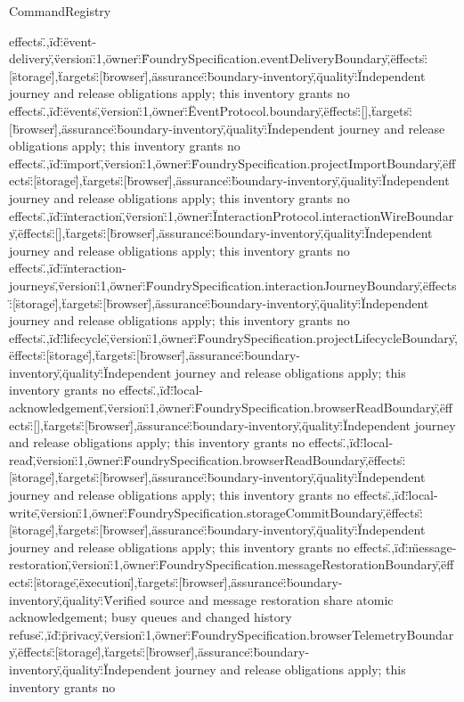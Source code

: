 \begin{lexlean}{CommandRegistry}
\begin{semanticmodule}
{effects.\"},{\"id\":\"event-delivery\",\"version\":1,\"owner\":\"FoundrySpecification.eventDeliveryBoundary\",\"effects\":[\"storage\"],\"targets\":[\"browser\"],\"assurance\":\"boundary-inventory\",\"quality\":\"Independent journey and release obligations apply; this inventory grants no effects.\"},{\"id\":\"events\",\"version\":1,\"owner\":\"EventProtocol.boundary\",\"effects\":[],\"targets\":[\"browser\"],\"assurance\":\"boundary-inventory\",\"quality\":\"Independent journey and release obligations apply; this inventory grants no effects.\"},{\"id\":\"import\",\"version\":1,\"owner\":\"FoundrySpecification.projectImportBoundary\",\"effects\":[\"storage\"],\"targets\":[\"browser\"],\"assurance\":\"boundary-inventory\",\"quality\":\"Independent journey and release obligations apply; this inventory grants no effects.\"},{\"id\":\"interaction\",\"version\":1,\"owner\":\"InteractionProtocol.interactionWireBoundary\",\"effects\":[],\"targets\":[\"browser\"],\"assurance\":\"boundary-inventory\",\"quality\":\"Independent journey and release obligations apply; this inventory grants no effects.\"},{\"id\":\"interaction-journeys\",\"version\":1,\"owner\":\"FoundrySpecification.interactionJourneyBoundary\",\"effects\":[\"storage\"],\"targets\":[\"browser\"],\"assurance\":\"boundary-inventory\",\"quality\":\"Independent journey and release obligations apply; this inventory grants no effects.\"},{\"id\":\"lifecycle\",\"version\":1,\"owner\":\"FoundrySpecification.projectLifecycleBoundary\",\"effects\":[\"storage\"],\"targets\":[\"browser\"],\"assurance\":\"boundary-inventory\",\"quality\":\"Independent journey and release obligations apply; this inventory grants no effects.\"},{\"id\":\"local-acknowledgement\",\"version\":1,\"owner\":\"FoundrySpecification.browserReadBoundary\",\"effects\":[],\"targets\":[\"browser\"],\"assurance\":\"boundary-inventory\",\"quality\":\"Independent journey and release obligations apply; this inventory grants no effects.\"},{\"id\":\"local-read\",\"version\":1,\"owner\":\"FoundrySpecification.browserReadBoundary\",\"effects\":[\"storage\"],\"targets\":[\"browser\"],\"assurance\":\"boundary-inventory\",\"quality\":\"Independent journey and release obligations apply; this inventory grants no effects.\"},{\"id\":\"local-write\",\"version\":1,\"owner\":\"FoundrySpecification.storageCommitBoundary\",\"effects\":[\"storage\"],\"targets\":[\"browser\"],\"assurance\":\"boundary-inventory\",\"quality\":\"Independent journey and release obligations apply; this inventory grants no effects.\"},{\"id\":\"message-restoration\",\"version\":1,\"owner\":\"FoundrySpecification.messageRestorationBoundary\",\"effects\":[\"storage\",\"execution\"],\"targets\":[\"browser\"],\"assurance\":\"boundary-inventory\",\"quality\":\"Verified source and message restoration share atomic acknowledgement; busy queues and changed history refuse.\"},{\"id\":\"privacy\",\"version\":1,\"owner\":\"FoundrySpecification.browserTelemetryBoundary\",\"effects\":[\"storage\"],\"targets\":[\"browser\"],\"assurance\":\"boundary-inventory\",\"quality\":\"Independent journey and release obligations apply; this inventory grants no }
\end{semanticmodule}
\end{lexlean}
